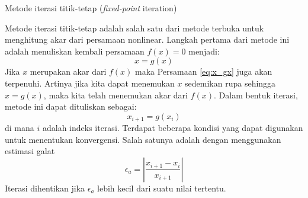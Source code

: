 \begin{frame}{Metode iterasi titik-tetap (\textit{fixed-point} iteration)}
\fontsize{10}{11}\selectfont

Metode iterasi titik-tetap adalah salah satu dari metode terbuka untuk menghitung
akar dari persamaan nonlinear.
Langkah pertama dari metode ini adalah menuliskan kembali persamaan
$f(x) = 0$ menjadi:
\begin{equation}
x = g(x)  
\label{eq:x_gx}
\end{equation}
Jika $x$ merupakan akar dari $f(x)$ maka Persamaan \eqref{eq:x_gx}
juga akan terpenuhi. Artinya jika kita dapat menemukan $x$ sedemikan rupa sehingga
$x = g(x)$, maka kita telah menemukan akar dari $f(x)$.
Dalam bentuk iterasi, metode ini dapat dituliskan sebagai:
$$
x_{i+1} = g(x_{i})
$$
di mana $i$ adalah indeks iterasi. Terdapat beberapa kondisi yang dapat
digunakan untuk menentukan konvergensi. Salah satunya adalah dengan
menggunakan estimasi galat
$$
\epsilon_{a} = \left| \frac{x_{i+1} - x_{i}}{x_{i+1}} \right|
$$
Iterasi dihentikan jika $\epsilon_{a}$ lebih kecil dari suatu nilai
tertentu.
\end{frame}


